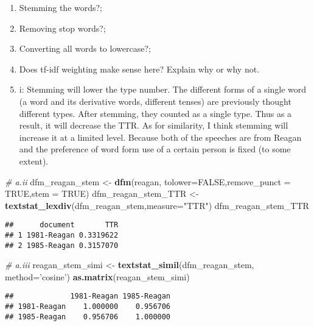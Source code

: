 \documentclass[]{article}
\newenvironment{Shaded}{\begin{snugshade}}{\end{snugshade}}
\newcommand{\KeywordTok}[1]{\textcolor[rgb]{0.13,0.29,0.53}{\textbf{#1}}}
\newcommand{\DataTypeTok}[1]{\textcolor[rgb]{0.13,0.29,0.53}{#1}}
\newcommand{\StringTok}[1]{\textcolor[rgb]{0.31,0.60,0.02}{#1}}
\newcommand{\CommentTok}[1]{\textcolor[rgb]{0.56,0.35,0.01}{\textit{#1}}}
\newcommand{\OtherTok}[1]{\textcolor[rgb]{0.56,0.35,0.01}{#1}}
\newcommand{\NormalTok}[1]{#1}
\begin{document}
\begin{enumerate}
\def\labelenumi{(\alph{enumi})}
\item
  Stemming the words?;
\item
  Removing stop words?;
\item
  Converting all words to lowercase?;
\item
  Does tf-idf weighting make sense here? Explain why or why not.
\item
  i: Stemming will lower the type number. The different forms of a
  single word (a word and its derivative words, different tenses) are
  previously thought different types. After stemming, they counted as a
  single type. Thus as a result, it will decrease the TTR. As for
  similarity, I think stemming will increase it at a limited level.
  Because both of the speeches are from Reagan and the preference of
  word form use of a certain person is fixed (to some extent).
\end{enumerate}

\begin{Shaded}
\begin{Highlighting}[]
\CommentTok{# a.ii}
\NormalTok{dfm_reagan_stem <-}\StringTok{ }\KeywordTok{dfm}\NormalTok{(reagan, }\DataTypeTok{tolower=}\OtherTok{FALSE}\NormalTok{,}\DataTypeTok{remove_punct =} \OtherTok{TRUE}\NormalTok{,}\DataTypeTok{stem =} \OtherTok{TRUE}\NormalTok{)}
\NormalTok{dfm_reagan_stem_TTR <-}\StringTok{ }\KeywordTok{textstat_lexdiv}\NormalTok{(dfm_reagan_stem,}\DataTypeTok{measure=}\StringTok{"TTR"}\NormalTok{)}
\NormalTok{dfm_reagan_stem_TTR}
\end{Highlighting}
\end{Shaded}

\begin{verbatim}
##      document       TTR
## 1 1981-Reagan 0.3319622
## 2 1985-Reagan 0.3157070
\end{verbatim}

\begin{Shaded}
\begin{Highlighting}[]
\CommentTok{# a.iii}
\NormalTok{reagan_stem_simi <-}\StringTok{ }\KeywordTok{textstat_simil}\NormalTok{(dfm_reagan_stem, }\DataTypeTok{method=}\StringTok{'cosine'}\NormalTok{)}
\KeywordTok{as.matrix}\NormalTok{(reagan_stem_simi)}
\end{Highlighting}
\end{Shaded}

\begin{verbatim}
##             1981-Reagan 1985-Reagan
## 1981-Reagan    1.000000    0.956706
## 1985-Reagan    0.956706    1.000000
\end{verbatim}
\end{document}
